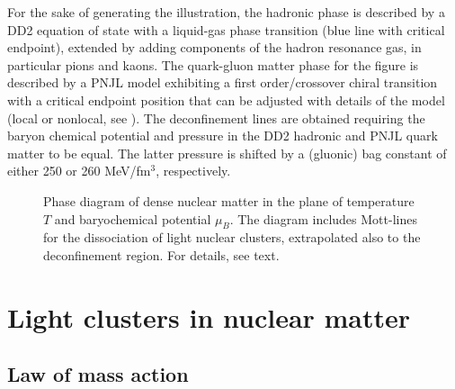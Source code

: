 \documentclass[epj]{svjour}
\begin{document}
For the sake of generating the illustration, the hadronic phase is described by a DD2 equation of state 
\cite{Typel:2009sy}
with a liquid-gas phase transition (blue line with critical endpoint), extended by adding components of the hadron resonance gas, in particular pions and kaons.
The quark-gluon matter phase for the figure is described by a PNJL model exhibiting a first order/crossover chiral transition with a critical endpoint position that can be adjusted with details of the model (local or nonlocal, see \cite{Contrera:2012wj,Contrera:2016rqj}). 
The deconfinement lines are obtained requiring the baryon chemical potential and pressure in the DD2 hadronic and PNJL quark matter to be equal. 
The latter pressure is shifted by a (gluonic) bag constant of either 250 or 260 MeV/fm$^3$, respectively.
%
\begin{figure}[!t]
\caption{Phase diagram of dense nuclear matter in the plane of temperature $T$ and baryochemical potential $\mu_B$.
The diagram includes Mott-lines for the dissociation of light nuclear clusters, extrapolated also to the deconfinement region. For details, see text.
\label{PD-Mott}      
}
\end{figure}



\section{Light clusters in nuclear matter}

\subsection{Law of mass action}
\end{document}
